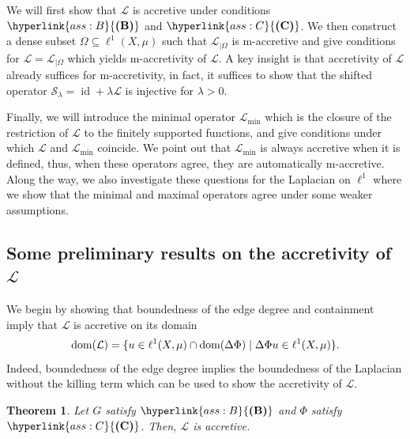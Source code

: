 \documentclass[letterpaper]{article}
\newtheorem{theorem}[lemma]{Theorem}
\theoremstyle{definition}
\theoremstyle{named}
\numberwithin{equation}{section}
\newcommand{\B}{\hyperlink{ass:B}{\textup{\textbf{(B)}}}}
\newcommand{\C}{\hyperlink{ass:C}{\textup{\textbf{(C)}}}}
\newcommand{\dom}{\textnormal{dom}} %
\newcommand{\id}{\operatorname{id}}
\newcommand{\Deltaphi}{\mathcal{L}}
\newcommand{\deltaphim}{\mathcal{L}_{\min}}
\newcommand{\Deltaphiom}{\Deltaphi_{|\Omega}}
\begin{document}
We will first show that $\Deltaphi$ is accretive under conditions $\B$ and $\C$. 
We then construct a dense subset $\Omega \subseteq \ell^1(X,\mu)$ 
such that $\Deltaphiom$ is m-accretive and
give conditions for $\Deltaphi = \Deltaphiom$ 
which yields m-accretivity of $\Deltaphi$. 
A key insight is that accretivity of $\Deltaphi$ already suffices for m-accretivity,
in fact,  it suffices to show that the shifted operator
$\mathcal{S}_\lambda = \id + \lambda\Deltaphi$ is injective for $\lambda > 0$.

Finally, we will  introduce
the minimal operator $\deltaphim$ which is the closure of the restriction
of $\Deltaphi$ to the finitely supported functions, 
and give conditions
under which $\Deltaphi$ and $\deltaphim$ coincide.
We point out that $\deltaphim$ is always accretive when it is defined, thus,
when these operators agree, they are automatically m-accretive.
Along the way, we also investigate these questions for the Laplacian on $\ell^1$ where
we show that the minimal and maximal operators agree under some weaker assumptions.


\subsection{\texorpdfstring{Some preliminary results on the accretivity of $\Deltaphi$}{Some preliminary results on the accretivity of Delta Phi}}


We begin by showing that
boundedness of the edge degree and containment imply that $\Deltaphi$ is accretive on its domain
$$\dom(\Deltaphi)=\{u \in \ell^1(X,\mu) \cap \dom (\Delta \Phi) \mid \Delta \Phi u \in \ell^1(X,\mu)\}.$$
Indeed, boundedness of the edge degree
implies the boundedness of the Laplacian without the killing term 
which can be used to show the accretivity
of $\Deltaphi$.
\begin{theorem}\label{t:accretivity_bd}
Let $G$ satisfy $\B$ and $\Phi$ satisfy $\C$. Then, $\Deltaphi$ is
accretive.
\end{theorem}
\end{document}

